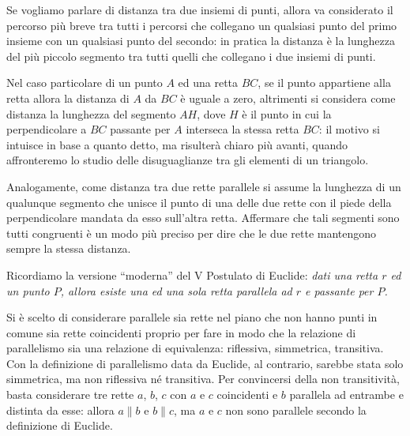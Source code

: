 Se vogliamo parlare di distanza tra due insiemi di punti, allora va 
considerato il percorso più breve tra tutti i percorsi che collegano 
un qualsiasi punto del primo insieme con un qualsiasi punto del 
secondo: in pratica la distanza è la lunghezza del più piccolo 
segmento tra tutti quelli che collegano i due insiemi di punti. 

Nel caso particolare di un punto $A$ ed una retta $BC$, se il punto 
appartiene alla retta allora la distanza di $A$ da $BC$ è uguale a 
zero, altrimenti si considera come distanza la lunghezza del segmento 
$AH$, dove $H$ è il punto in cui la perpendicolare a $BC$ passante 
per $A$ interseca la stessa retta $BC$: il motivo si intuisce in base 
a quanto detto, ma risulterà chiaro più avanti, quando affronteremo 
lo studio delle disuguaglianze tra gli elementi di un triangolo. 

Analogamente, come distanza tra due rette parallele si assume la 
lunghezza di un qualunque segmento che unisce il punto di una delle 
due rette con il piede della perpendicolare mandata da esso 
sull'altra retta. Affermare che tali segmenti sono tutti congruenti è 
un modo più preciso per dire che le due rette mantengono sempre la 
stessa distanza.

Ricordiamo la versione ``moderna'' del V Postulato di Euclide: 
\emph{dati una retta $r$ ed un punto $P$, allora esiste una ed una 
  sola retta parallela ad $r$ e passante per $P$.}

Si è scelto di considerare 
parallele sia rette nel piano che non hanno punti in comune sia rette 
coincidenti proprio per fare in modo che la relazione di parallelismo 
sia una relazione di equivalenza: riflessiva, simmetrica, transitiva. 
Con la definizione di parallelismo data da Euclide, al contrario, 
sarebbe stata solo simmetrica, ma non riflessiva né transitiva. Per 
convincersi della non transitività, basta considerare tre rette $a$, 
$b$, $c$ con $a$ e $c$ coincidenti e $b$ parallela ad entrambe e 
distinta da esse: allora $a\parallel b$ e $b \parallel c$, ma $a$ e 
$c$ non sono parallele secondo la definizione di Euclide.


